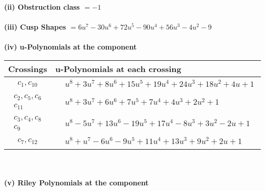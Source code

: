 \documentclass[1p]{elsarticle_modified}
\theoremstyle{definition}
\begin{document}
\flushleft \textbf{(ii) Obstruction class $= -1$}\\~\\
\flushleft \textbf{(iii) Cusp Shapes $= 6 u^7-30 u^6+72 u^5-90 u^4+56 u^3-4 u^2-9$}\\~\\
\newpage\renewcommand{\arraystretch}{1}
\flushleft \textbf{(iv) u-Polynomials at the component}\newline \\
\begin{tabular}{m{50pt}|m{274pt}}
Crossings & \hspace{64pt}u-Polynomials at each crossing \\
\hline $$\begin{aligned}c_{1},c_{10}\end{aligned}$$&$\begin{aligned}
&u^8+3 u^7+8 u^6+15 u^5+19 u^4+24 u^3+18 u^2+4 u+1
\end{aligned}$\\
\hline $$\begin{aligned}c_{2},c_{5},c_{6}\\c_{11}\end{aligned}$$&$\begin{aligned}
&u^8+3 u^7+6 u^6+7 u^5+7 u^4+4 u^3+2 u^2+1
\end{aligned}$\\
\hline $$\begin{aligned}c_{3},c_{4},c_{8}\\c_{9}\end{aligned}$$&$\begin{aligned}
&u^8-5 u^7+13 u^6-19 u^5+17 u^4-8 u^3+3 u^2-2 u+1
\end{aligned}$\\
\hline $$\begin{aligned}c_{7},c_{12}\end{aligned}$$&$\begin{aligned}
&u^8+u^7-6 u^6-9 u^5+11 u^4+13 u^3+9 u^2+2 u+1
\end{aligned}$\\
\hline
\end{tabular}\\~\\
\newpage\renewcommand{\arraystretch}{1}
\flushleft \textbf{(v) Riley Polynomials at the component}\newline \\
\end{document}
